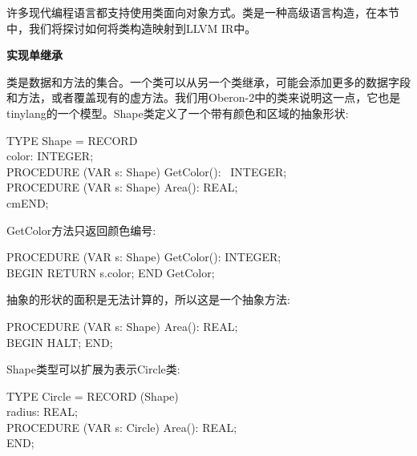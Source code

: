 许多现代编程语言都支持使用类面向对象方式。类是一种高级语言构造，在本节中，我们将探讨如何将类构造映射到LLVM IR中。\par

\hspace*{\fill} \par %
\textbf{实现单继承}

类是数据和方法的集合。一个类可以从另一个类继承，可能会添加更多的数据字段和方法，或者覆盖现有的虚方法。我们用Oberon-2中的类来说明这一点，它也是tinylang的一个模型。Shape类定义了一个带有颜色和区域的抽象形状:\par

\begin{tcolorbox}[colback=white,colframe=black]
TYPE Shape = RECORD \\
\hspace*{3cm}color: INTEGER; \\
\hspace*{3cm}PROCEDURE (VAR s: Shape) GetColor(): \
\hspace*{3.5cm}INTEGER; \\
\hspace*{3cm}PROCEDURE (VAR s: Shape) Area(): REAL;\\
\hspace*{2.5cm}cmEND;
\end{tcolorbox}

GetColor方法只返回颜色编号:\par

\begin{tcolorbox}[colback=white,colframe=black]
PROCEDURE (VAR s: Shape) GetColor(): INTEGER; \\
BEGIN RETURN s.color; END GetColor;
\end{tcolorbox}

抽象的形状的面积是无法计算的，所以这是一个抽象方法:\par

\begin{tcolorbox}[colback=white,colframe=black]
PROCEDURE (VAR s: Shape) Area(): REAL; \\
BEGIN HALT; END;
\end{tcolorbox}

Shape类型可以扩展为表示Circle类:\par

\begin{tcolorbox}[colback=white,colframe=black]
TYPE Circle = RECORD (Shape) \\
\hspace*{3cm}radius: REAL; \\
\hspace*{3cm}PROCEDURE (VAR s: Circle) Area(): REAL; \\
\hspace*{2.5cm}END;
\end{tcolorbox}

